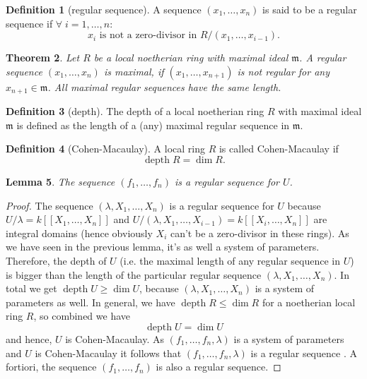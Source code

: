 \documentclass{article}
\theoremstyle{plain}%
\newtheorem{theorem}{Theorem}[section]
\newtheorem{lemma}[theorem]{Lemma}
\theoremstyle{definition}
\newtheorem{definition}[theorem]{Definition}
\theoremstyle{remark}
\begin{document}
\begin{definition}[regular sequence]\cite[cf.][definition 1.1.1]{Bruns1998}
    A sequence \((x_1, \dots, x_n)\) is said to be a regular sequence 
    if \(\forall\; i = 1, \dots, n\colon\)
    \[x_i \text{ is not a zero-divisor in } R/(x_1, \dots, x_{i-1}).\]
\end{definition}

\begin{theorem}\cite[theorem 1.2.5]{Bruns1998}
    Let \(R\) be a local noetherian ring with maximal ideal \(\mathfrak{m}\).
    A regular sequence \((x_1, \dots, x_n)\) is maximal, if \((x_1, \dots, x_{n+1})\)
    is not regular for any \(x_{n+1} \in \mathfrak{m}\).
    All maximal regular sequences have the same length.
\end{theorem}

\begin{definition}[depth]\cite[definition 1.2.6, 1.2.7]{Bruns1998}
    The depth of a local noetherian ring \(R\) with maximal ideal \(\mathfrak{m}\) is 
    defined as the length of a (any) maximal regular sequence in \(\mathfrak{m}\).
\end{definition}

\begin{definition}[Cohen-Macaulay]
    A local ring \(R\) is called Cohen-Macaulay if 
    \[
        \operatorname{depth} R = \operatorname{dim} R.  
    \]
\end{definition}

\begin{lemma}\label{lem:reg_seq}\textup{\cite[lemma 5.11]{Darmon1995}}
    The sequence \((f_1, \dots, f_n)\) is a regular sequence for \(U\).
\end{lemma}
\begin{proof}
    The sequence \((\lambda, X_1, \dots, X_n)\) is a regular sequence for \(U\) because
    \(U/\lambda = k[[X_1, \dots, X_n]]\) and \(U/(\lambda, X_1, \dots, X_{i-1}) = k[[X_i, \dots, X_n]]\) 
    are integral domains (hence obviously \(X_i\) can't be a zero-divisor in these rings).
    As we have seen in the previous lemma, it's as well a system of parameters.
    Therefore, the depth of \(U\) (i.e. the maximal length of any regular sequence in \(U\)) is bigger than
    the length of the particular regular sequence \((\lambda, X_1, \dots, X_n)\).
    In total we get \(\operatorname{depth} U \geq \dim U\), because \((\lambda, X_1, \dots, X_n)\) 
    is a system of parameters as well.
    In general, we have \(\operatorname{depth} R \leq \dim R\) for a noetherian local ring \(R\), 
    so combined we have
    \[
        \operatorname{depth} U = \dim U  
    \]
    and hence, \(U\) is Cohen-Macaulay.
    As \((f_1, \dots, f_n, \lambda)\) is a system of parameters and \(U\) is Cohen-Macaulay
    it follows that \((f_1, \dots, f_n, \lambda)\) is a regular sequence \cite[theorem 17.4]{Matsumura1986}.
    A fortiori, the sequence \((f_1, \dots, f_n)\) is also a regular sequence.
\end{proof}
\end{document}
